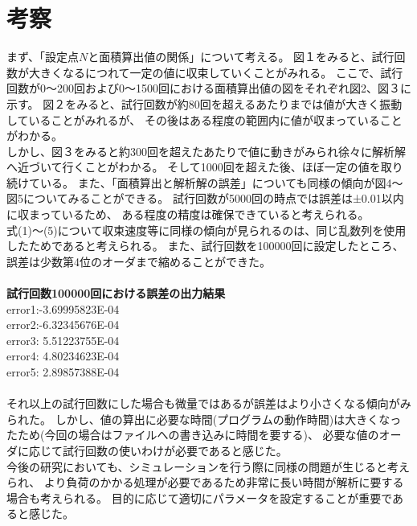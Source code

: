 \documentclass[12pt,a4paper]{jsarticle}
\begin{document}
\section{考察}
まず、「設定点$N$と面積算出値の関係」について考える。
図１をみると、試行回数が大きくなるにつれて一定の値に収束していくことがみれる。
ここで、試行回数が0〜200回および0〜1500回における面積算出値の図をそれぞれ図2、図３に示す。
図２をみると、試行回数が約80回を超えるあたりまでは値が大きく振動していることがみれるが、
その後はある程度の範囲内に値が収まっていることがわかる。\\
しかし、図３をみると約300回を超えたあたりで値に動きがみられ徐々に解析解へ近づいて行くことがわかる。
そして1000回を超えた後、ほぼ一定の値を取り続けている。
また、「面積算出と解析解の誤差」についても同様の傾向が図4〜図5についてみることができる。
試行回数が5000回の時点では誤差は±0.01以内に収まっているため、
ある程度の精度は確保できていると考えられる。\\
式(1)〜(5)について収束速度等に同様の傾向が見られるのは、同じ乱数列を使用したためであると考えられる。
また、試行回数を100000回に設定したところ、誤差は少数第4位のオーダまで縮めることができた。\\
\\
\textbf{試行回数100000回における誤差の出力結果}\\
error1:-3.69995823E-04\\
error2:-6.32345676E-04\\
error3: 5.51223755E-04\\
error4: 4.80234623E-04\\
error5: 2.89857388E-04\\
\\
それ以上の試行回数にした場合も微量ではあるが誤差はより小さくなる傾向がみられた。
しかし、値の算出に必要な時間(プログラムの動作時間)は大きくなったため(今回の場合はファイルへの書き込みに時間を要する)、
必要な値のオーダに応じて試行回数の使いわけが必要であると感じた。\\
今後の研究においても、シミュレーションを行う際に同様の問題が生じると考えられ、
より負荷のかかる処理が必要であるため非常に長い時間が解析に要する場合も考えられる。
目的に応じて適切にパラメータを設定することが重要であると感じた。
\end{document}
